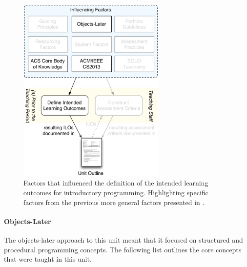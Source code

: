 \begin{figure}[htbp]
	\centering
	\includegraphics[width=0.65\textwidth]{ILOFactors}
	\caption{Factors that influenced the definition of the intended learning outcomes for introductory programming. Highlighting specific factors from the previous more general factors presented in .}
	\label{fig:defining_ilos_intro}
\end{figure}

\paragraph{Objects-Later} %
\label{par:intro:objects_later}
The objects-later approach to this unit meant that it focused on structured and procedural programming concepts. The following list outlines the core concepts that were taught in this unit.

